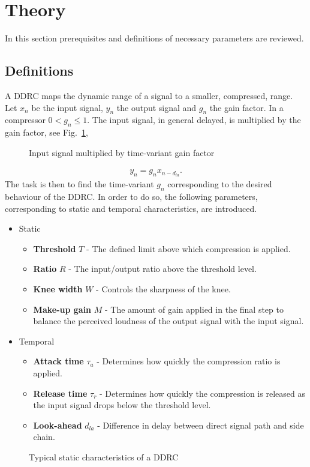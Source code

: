 \documentclass[../main2.tex]{subfiles}
\providecommand{\rootdir}{..}
\begin{document}
\section{Theory}\label{sec_theory}
In this section prerequisites and definitions of necessary parameters are reviewed.
\subsection{Definitions}\label{theory_definitions}
A DDRC maps the dynamic range of a signal to a smaller, compressed, range. Let $x_n$ be the input signal, $y_n$ the output signal and $g_n$ the gain factor. In a compressor $0<g_n\leq 1$. The input signal, in general delayed, is multiplied by the gain factor, see Fig.~\ref{fig:block_gain},
\begin{figure}
\centerline{}
\caption{Input signal multiplied by time-variant gain factor}
\label{fig:block_gain}
\end{figure}
\begin{align}
y_n = g_nx_{n-d_{la}}.
\label{eq:gainfactor}
\end{align}
The task is then to find the time-variant $g_n$ corresponding to the desired behaviour of the DDRC. In order to do so, the following parameters, corresponding to static and temporal characteristics, are introduced.
\begin{itemize}
\item{Static}
	\begin{itemize}
	\item \textbf{Threshold} $T$ - The defined limit above which compression is applied.
	\item \textbf{Ratio} $R$ - The input/output ratio above the threshold level.
	\item \textbf{Knee width}  $W$ - Controls the sharpness of the knee.
	\item \textbf{Make-up gain}  $M$ - The amount of gain applied in the final step to balance the perceived loudness of the output signal with the input signal.
\end{itemize}
\item{Temporal}
	\begin{itemize}
	\item \textbf{Attack time} $\tau_{a}$ - Determines how quickly the compression ratio is applied.
	\item \textbf{Release time} $\tau_{r}$ - Determines how quickly the compression is released as the input signal drops below the threshold level.
	\item \textbf{Look-ahead} $d_{la}$ - Difference in delay between direct signal path and side chain. 
	\end{itemize}
\end{itemize}
\begin{figure}
\centerline{}
\caption{Typical static characteristics of a DDRC}
\label{fig:typical_static_detailed}
\end{figure}
\end{document}
